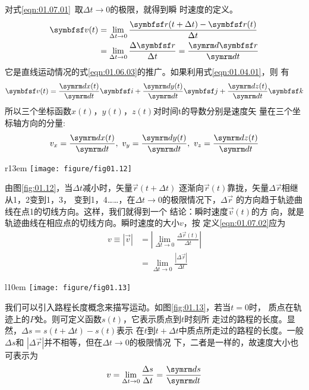 对式\eqref{eqn:01.07.01}~取$\Delta t \rightarrow 0$的极限，就得到瞬
时速度的定义。
\begin{equation}\label{eqn:01.07.02}
    \begin{aligned}
        \vec{v}(t) & =\lim _{\Delta t \rightarrow 0} \frac{\vec{r}(t+\Delta t)-\vec{r}(t)}{\Delta t} \\
                  & =\lim _{\Delta t \rightarrow 0} \frac{\Delta \vec{r}}{\Delta t} =\frac{\dif\vec{r}}{\dif t}
    \end{aligned}
\end{equation}
它是直线运动情况的式\eqref{eqn:01.06.03}的推广。如果利用式\eqref{eqn:01.04.01}，则
有
\begin{equation}\label{eqn:01.07.03}
    \vec{v}(t)=\frac{\dif x(t)}{\dif t} \vec{i}+\frac{\dif y(t)}{\dif t} \vec{j}+\frac{\dif z(t)}{\dif t} \vec{k}
\end{equation}
所以三个坐标函数$x(t)$，$y(t)$，$z(t)$对时间t的导数分别是速度矢
量在三个坐标轴方向的分量:
\begin{equation}\label{eqn:01.07.04}
    v_{x}=\frac{\dif x(t)}{\dif t}, ~ v_{y}=\frac{\dif y(t)}{\dif t}, ~ v_{z}=\frac{\dif z(t)}{\dif t}
\end{equation}
\clearpage
\begin{wrapfigure}[7]{r}{13em}
    \centering
    \small
    \texttt{[image: figure/fig01.12]}
    \caption{曲线运动的瞬时速度}
    \label{fig:01.12}
\end{wrapfigure}
由图\ref{fig:01.12}，当$\Delta t$减小时，矢量$\vec{r}(t+\Delta t)$
逐渐向$\vec{r}(t)$靠拢，矢量$\Delta \vec{r}$相继从1，2变到1，3，
变到1，4……，在$\Delta t \rightarrow 0$的极限情况下，$\Delta \vec{r}$
的方向趋于轨迹曲线在点1的切线方向。这样，我们就得到一个
结论：瞬时速度$\vec{v}(t)$的方
向，就是轨迹曲线在相应点的切线方向。瞬时速度的大小$v$，按
定义\eqref{eqn:01.07.02}应为
\setlength{\mathindent}{15em}
\begin{equation*}
    \begin{aligned}
        v\equiv |\vec{v}| & =\left|\lim _{\Delta t \rightarrow 0} \frac{\Delta \vec{r}(t)}{\Delta t}\right| \\
                         & =\lim _{\Delta t \rightarrow 0} \frac{|\Delta \vec{r}|}{\Delta t}
    \end{aligned}
\end{equation*}

\setlength{\mathindent}{6em}
\begin{wrapfigure}[4]{l}{10em}
    \vspace{-6em}
    \centering
    \small
    \texttt{[image: figure/fig01.13]}
    \caption{用路程长度$s(t)$来描写运动}
    \label{fig:01.13}
\end{wrapfigure}
\noindent 我们可以引入路程长度概念来描写运动。如图\ref{fig:01.13}，若当$t=0$时，
质点在轨迹上的$P$处。则可定义函数$s(t)$，它表示质点到$t$时刻所
走过的路程的长度。显然，$\Delta s=s(t+\Delta t)-s(t)$表示
在$t$到$t+\Delta t$中质点所走过的路程的长度。一般$\Delta s$和
$|\Delta \vec{r}|$并不相等，但在$\Delta t \rightarrow 0$的极限情况
下，二者是一样的，故速度大小也可表示为
\begin{equation}\label{eqn:01.07.05}
    v=\lim_{\Delta t \rightarrow 0}\frac{\Delta s}{\Delta t}=\frac{\dif s}{\dif t}
\end{equation}

